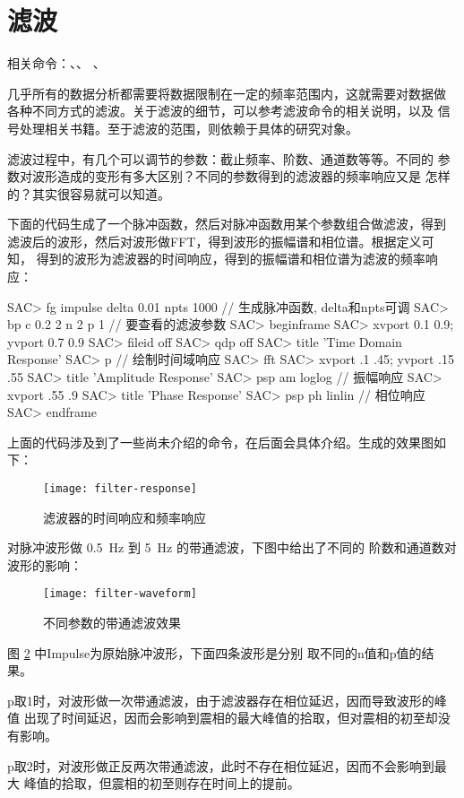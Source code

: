 \section{滤波}
相关命令：、、
、

几乎所有的数据分析都需要将数据限制在一定的频率范围内，这就需要对数据做
各种不同方式的滤波。关于滤波的细节，可以参考滤波命令的相关说明，以及
信号处理相关书籍。至于滤波的范围，则依赖于具体的研究对象。

滤波过程中，有几个可以调节的参数：截止频率、阶数、通道数等等。不同的
参数对波形造成的变形有多大区别？不同的参数得到的滤波器的频率响应又是
怎样的？其实很容易就可以知道。

下面的代码生成了一个脉冲函数，然后对脉冲函数用某个参数组合做滤波，得到
滤波后的波形，然后对波形做FFT，得到波形的振幅谱和相位谱。根据定义可知，
得到的波形为滤波器的时间响应，得到的振幅谱和相位谱为滤波的频率响应：
\begin{SACCode}
SAC> fg impulse delta 0.01 npts 1000   // 生成脉冲函数, delta和npts可调
SAC> bp c 0.2 2 n 2 p 1                // 要查看的滤波参数
SAC> beginframe
SAC> xvport 0.1 0.9; yvport 0.7 0.9
SAC> fileid off
SAC> qdp off
SAC> title 'Time Domain Response'
SAC> p                                // 绘制时间域响应
SAC> fft
SAC> xvport .1 .45; yvport .15 .55
SAC> title 'Amplitude Response'
SAC> psp am loglog                    // 振幅响应
SAC> xvport .55 .9
SAC> title 'Phase Response'
SAC> psp ph linlin                    // 相位响应
SAC> endframe
\end{SACCode}
上面的代码涉及到了一些尚未介绍的命令，在后面会具体介绍。生成的效果图如下：
\begin{figure}[H]
\centering
\texttt{[image: filter-response]}
\caption{滤波器的时间响应和频率响应}
\label{fig:filter-response}
\end{figure}

对脉冲波形做 \SI{0.5}{\Hz} 到 \SI{5}{\Hz} 的带通滤波，下图中给出了不同的
阶数和通道数对波形的影响：
\begin{figure}[H]
\centering
\texttt{[image: filter-waveform]}
\caption{不同参数的带通滤波效果}
\label{fig:filter-waveform}
\end{figure}
图 \ref{fig:filter-waveform} 中Impulse为原始脉冲波形，下面四条波形是分别
取不同的n值和p值的结果。

p取1时，对波形做一次带通滤波，由于滤波器存在相位延迟，因而导致波形的峰值
出现了时间延迟，因而会影响到震相的最大峰值的拾取，但对震相的初至却没有影响。

p取2时，对波形做正反两次带通滤波，此时不存在相位延迟，因而不会影响到最大
峰值的拾取，但震相的初至则存在时间上的提前。
